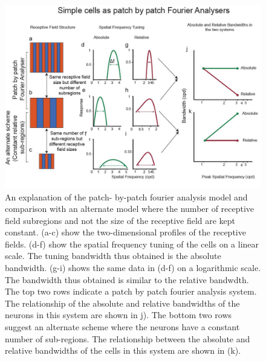 	\begin{figure}[]
		
		\includegraphics[width=\linewidth]{LinearV1/scheme.jpg}
		\caption{An explanation of the patch- by-patch fourier analysis model and comparison with an alternate model where the number of receptive field subregions
			and not the size of the receptive field are kept constant. (a-c) show the two-dimensional profiles of the receptive fields. (d-f) show the spatial		frequency tuning of the cells on a linear scale. The tuning bandwidth thus obtained is the absolute bandwidth. (g-i) shows the same data in (d-f)
			on a logarithmic scale. The bandwidth thus obtained is similar to the relative bandwdth. The top two rows indicate a patch by patch fourier analysis
			system. The relationship of the absolute and relative bandwidths of the neurons in this system are shown in j). The bottom two rows suggest an alternate
			scheme where the neurons have a constant number of sub-regions. The relationship between the absolute and relative bandwidths of the cells in
			this system are shown in (k).}
		\label{fig:summary}
	\end{figure}

